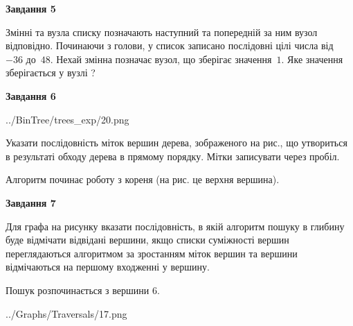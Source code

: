 \documentclass[12pt, ukrainian]{article}
\begin{document}
{\begin {large}
{\begin {center}\textbf{Завдання 5}\end {center}}\par
Змінні  та  вузла списку позначають наступний та попередній за ним вузол відповідно. Починаючи з голови, у список записано послідовні цілі числа від~$-36$ до~$48$. Нехай змінна  позначає вузол, що зберігає значення~$1$.
Яке значення зберігається у вузлі  ?\par
\newpage

{\begin {center}\textbf{Завдання 6}\end {center}}\par

\begin{center}
	{../BinTree/trees_exp/20.png}
\end{center}
Указати послідовність міток вершин дерева, зображеного на рис., що утвориться в результаті обходу дерева в прямому порядку. Мітки записувати через пробіл.\par Алгоритм починає роботу з кореня (на рис. це верхня вершина).\par
\newpage

{\begin {center}\textbf{Завдання 7}\end {center}}\par
Для графа на рисунку вказати послідовність, в якій алгоритм пошуку в глибину буде відмічати відвідані вершини, якщо списки суміжності вершин переглядаються алгоритмом за зростанням міток вершин та вершини відмічаються на першому вход\-женні у вершину.\par
Пошук розпочинається з вершини 6.\par

\begin{center}
	{../Graphs/Traversals/17.png}
\end{center}\par
\newpage


\end{large}}
\end{document}
